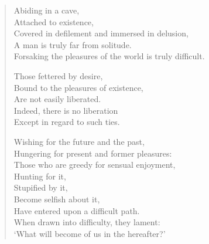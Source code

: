 
\begin{verse}

 Abiding in a cave,\\
Attached to existence,\\
Covered in defilement and immersed in delusion,\\
A man is truly far from solitude.\\
Forsaking the pleasures of the world is truly difficult.


 Those fettered by desire,\\
Bound to the pleasures of existence,\\
Are not easily liberated.\\
Indeed, there is no liberation\\
Except in regard to such ties.

Wishing for the future and the past,\\
Hungering for present and former pleasures:\\
Those who are greedy for sensual enjoyment,\\
Hunting for it,\\
Stupified by it,\\
Become selfish about it,\\
Have entered upon a difficult path.\\
When drawn into difficulty, they lament:\\
`What will become of us in the hereafter?'



\end{verse}
